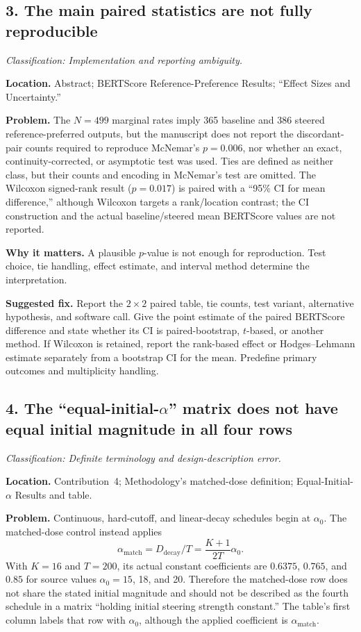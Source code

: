 \documentclass[11pt]{article}
\newcommand{\findinglabel}[1]{\textbf{#1}}
\newcommand{\classification}[1]{\textit{Classification: #1.}}
\begin{document}
\subsection*{3. The main paired statistics are not fully reproducible}

\classification{Implementation and reporting ambiguity}

\findinglabel{Location.} Abstract; BERTScore Reference-Preference Results; ``Effect Sizes and Uncertainty.''

\findinglabel{Problem.} The $N=499$ marginal rates imply 365 baseline and 386 steered reference-preferred outputs, but the manuscript does not report the discordant-pair counts required to reproduce McNemar's $p=0.006$, nor whether an exact, continuity-corrected, or asymptotic test was used.  Ties are defined as neither class, but their counts and encoding in McNemar's test are omitted.  The Wilcoxon signed-rank result ($p=0.017$) is paired with a ``95\% CI for mean difference,'' although Wilcoxon targets a rank/location contrast; the CI construction and the actual baseline/steered mean BERTScore values are not reported.

\findinglabel{Why it matters.} A plausible $p$-value is not enough for reproduction.  Test choice, tie handling, effect estimate, and interval method determine the interpretation.

\findinglabel{Suggested fix.} Report the $2\times2$ paired table, tie counts, test variant, alternative hypothesis, and software call.  Give the point estimate of the paired BERTScore difference and state whether its CI is paired-bootstrap, $t$-based, or another method.  If Wilcoxon is retained, report the rank-based effect or Hodges--Lehmann estimate separately from a bootstrap CI for the mean.  Predefine primary outcomes and multiplicity handling.

\subsection*{4. The ``equal-initial-$\alpha$'' matrix does not have equal initial magnitude in all four rows}

\classification{Definite terminology and design-description error}

\findinglabel{Location.} Contribution~4; Methodology's matched-dose definition; Equal-Initial-$\alpha$ Results and table.

\findinglabel{Problem.} Continuous, hard-cutoff, and linear-decay schedules begin at $\alpha_0$.  The matched-dose control instead applies
\[
\alpha_{\mathrm{match}}=D_{\mathrm{decay}}/T
=\frac{K+1}{2T}\alpha_0.
\]
With $K=16$ and $T=200$, its actual constant coefficients are $0.6375$, $0.765$, and $0.85$ for source values $\alpha_0=15$, 18, and 20.  Therefore the matched-dose row does not share the stated initial magnitude and should not be described as the fourth schedule in a matrix ``holding initial steering strength constant.''  The table's first column labels that row with $\alpha_0$, although the applied coefficient is $\alpha_{\mathrm{match}}$.
\end{document}
